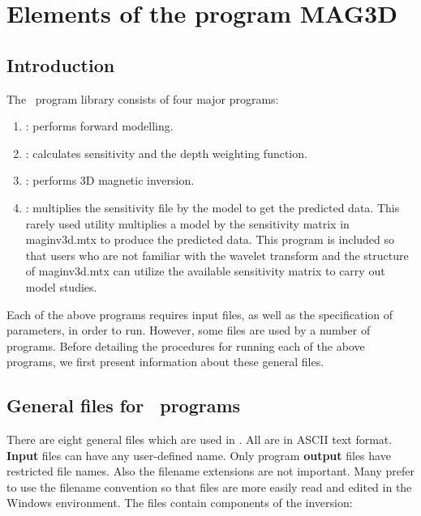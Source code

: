 \section{Elements of the program MAG3D}
\label{Elements}

\subsection{Introduction}

The \codeName{\prog} ~program library consists of four major programs:
\begin{enumerate}
\item {}: performs forward modelling.
\item {}: calculates sensitivity and the depth weighting function.
\item {}: performs 3D magnetic inversion.
\item {}: multiplies the sensitivity file by the model to get the predicted data. This rarely used utility multiplies a model by the sensitivity matrix in maginv3d.mtx to produce the predicted data. This program is included so that users who are not familiar with the wavelet transform and the structure of maginv3d.mtx can utilize the available sensitivity matrix to carry out model studies.
\end{enumerate}

Each of the above programs requires input files, as well as the specification of parameters, in order to run. However, some files are used by a number of programs. Before detailing the procedures for running each of the above programs, we first present information about these general files.

\subsection{General files for \prog ~programs}

There are eight general files which are used in \prog. All are in ASCII text format. \textbf{Input} files can have any user-defined name. Only program \textbf{output} files have restricted file names. Also the filename extensions are not important. Many prefer to use the  filename convention so that files are more easily read and edited in the Windows environment. The files contain components of the inversion:

